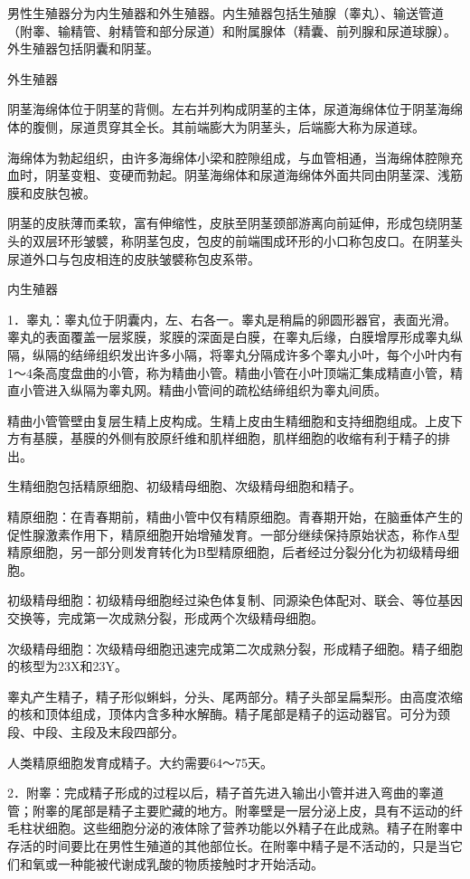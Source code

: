 \documentclass[12pt,UTF8,openany]{ctexbook}
\begin{document}
男性生殖器分为内生殖器和外生殖器。内生殖器包括生殖腺（睾丸）、输送管道（附睾、输精管、射精管和部分尿道）和附属腺体（精囊、前列腺和尿道球腺）。外生殖器包括阴囊和阴茎。

外生殖器

阴茎海绵体位于阴茎的背侧。左右并列构成阴茎的主体，尿道海绵体位于阴茎海绵体的腹侧，尿道贯穿其全长。其前端膨大为阴茎头，后端膨大称为尿道球。

海绵体为勃起组织，由许多海绵体小梁和腔隙组成，与血管相通，当海绵体腔隙充血时，阴茎变粗、变硬而勃起。阴茎海绵体和尿道海绵体外面共同由阴茎深、浅筋膜和皮肤包被。

阴茎的皮肤薄而柔软，富有伸缩性，皮肤至阴茎颈部游离向前延伸，形成包绕阴茎头的双层环形皱襞，称阴茎包皮，包皮的前端围成环形的小口称包皮口。在阴茎头尿道外口与包皮相连的皮肤皱襞称包皮系带。

内生殖器

1．睾丸：睾丸位于阴囊内，左、右各一。睾丸是稍扁的卵圆形器官，表面光滑。睾丸的表面覆盖一层浆膜，浆膜的深面是白膜，在睾丸后缘，白膜增厚形成睾丸纵隔，纵隔的结缔组织发出许多小隔，将睾丸分隔成许多个睾丸小叶，每个小叶内有1～4条高度盘曲的小管，称为精曲小管。精曲小管在小叶顶端汇集成精直小管，精直小管进入纵隔为睾丸网。精曲小管间的疏松结缔组织为睾丸间质。

精曲小管管壁由复层生精上皮构成。生精上皮由生精细胞和支持细胞组成。上皮下方有基膜，基膜的外侧有胶原纤维和肌样细胞，肌样细胞的收缩有利于精子的排出。

生精细胞包括精原细胞、初级精母细胞、次级精母细胞和精子。

精原细胞：在青春期前，精曲小管中仅有精原细胞。青春期开始，在脑垂体产生的促性腺激素作用下，精原细胞开始增殖发育。一部分继续保持原始状态，称作A型精原细胞，另一部分则发育转化为B型精原细胞，后者经过分裂分化为初级精母细胞。

初级精母细胞：初级精母细胞经过染色体复制、同源染色体配对、联会、等位基因交换等，完成第一次成熟分裂，形成两个次级精母细胞。

次级精母细胞：次级精母细胞迅速完成第二次成熟分裂，形成精子细胞。精子细胞的核型为23X和23Y。

睾丸产生精子，精子形似蝌蚪，分头、尾两部分。精子头部呈扁梨形。由高度浓缩的核和顶体组成，顶体内含多种水解酶。精子尾部是精子的运动器官。可分为颈段、中段、主段及末段四部分。

人类精原细胞发育成精子。大约需要64～75天。

2．附睾：完成精子形成的过程以后，精子首先进入输出小管并进入弯曲的睾道管；附睾的尾部是精子主要贮藏的地方。附睾壁是一层分泌上皮，具有不运动的纤毛柱状细胞。这些细胞分泌的液体除了营养功能以外精子在此成熟。精子在附睾中存活的时间要比在男性生殖道的其他部位长。在附睾中精子是不活动的，只是当它们和氧或一种能被代谢成乳酸的物质接触时才开始活动。
\end{document}
